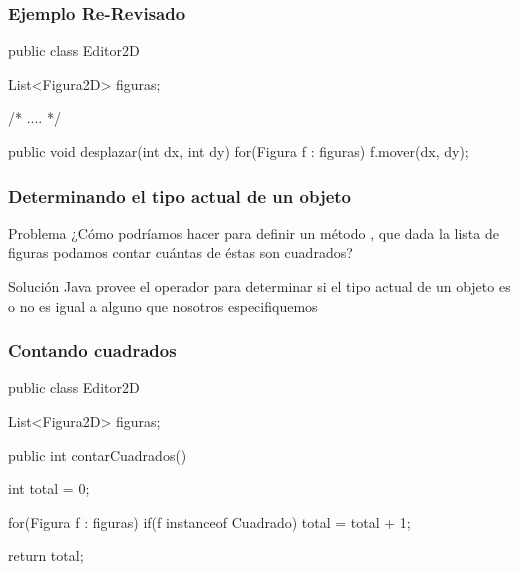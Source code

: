 \documentclass{beamer}
\begin{document}
\begin{frame}[fragile]
  \frametitle{Ejemplo Re-Revisado}

  \begin{jsmall}
    public class Editor2D {
      List<Figura2D> figuras;

      /* .... */
      
      public void desplazar(int dx, int dy) {      
        for(Figura f : figuras) {
          f.mover(dx, dy);
        }
      }      
    }    
  \end{jsmall}  
\end{frame}


\begin{frame}
  \frametitle{Determinando el tipo actual de un objeto}

  \begin{block}{Problema}
  ¿Cómo podríamos hacer para definir un método
  , que dada la lista de figuras podamos
  contar cuántas de éstas son cuadrados?
\end{block}

\pause

  \begin{block}{Solución}
Java provee el operador  para determinar si el tipo
actual de un objeto es o no es igual a alguno que nosotros especifiquemos
\end{block}
  
\end{frame}

\begin{frame}[fragile]
  \frametitle{Contando cuadrados}

  \begin{jsmall}
    public class Editor2D {
      List<Figura2D> figuras;
      
      public int contarCuadrados() {
        int total = 0;
        
        for(Figura f : figuras) {
          if(f instanceof Cuadrado) {
            total = total + 1;
          }
        }

        return total;
      }      
    }    
  \end{jsmall}  
\end{frame}
\end{document}
